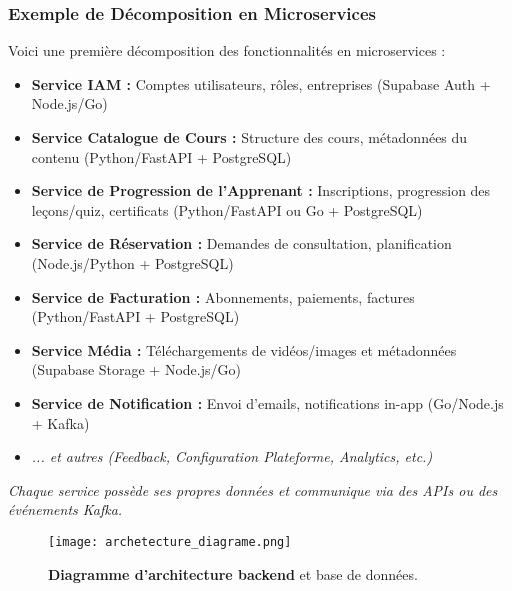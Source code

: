 \documentclass[12pt, a4paper]{article}
\begin{document}
\subsubsection{Exemple de Décomposition en Microservices}
Voici une première décomposition des fonctionnalités en microservices :
\begin{itemize}
  \item \textbf{Service IAM :} Comptes utilisateurs, rôles, entreprises (Supabase Auth + Node.js/Go)
  \item \textbf{Service Catalogue de Cours :} Structure des cours, métadonnées du contenu (Python/FastAPI + PostgreSQL)
  \item \textbf{Service de Progression de l'Apprenant :} Inscriptions, progression des leçons/quiz, certificats (Python/FastAPI ou Go + PostgreSQL)
  \item \textbf{Service de Réservation :} Demandes de consultation, planification (Node.js/Python + PostgreSQL)
  \item \textbf{Service de Facturation :} Abonnements, paiements, factures (Python/FastAPI + PostgreSQL)
  \item \textbf{Service Média :} Téléchargements de vidéos/images et métadonnées (Supabase Storage + Node.js/Go)
  \item \textbf{Service de Notification :} Envoi d'emails, notifications in-app (Go/Node.js + Kafka)
  \item \textit{... et autres (Feedback, Configuration Plateforme, Analytics, etc.)}
\end{itemize}
\textit{Chaque service possède ses propres données et communique via des APIs ou des événements Kafka.}

\begin{figure}[h!]
  \centering
  \texttt{[image: archetecture\_diagrame.png]}
  \caption{\textbf{Diagramme d'architecture backend} et base de données.}
  \label{fig:architecture_diagram}
\end{figure}
\end{document}
